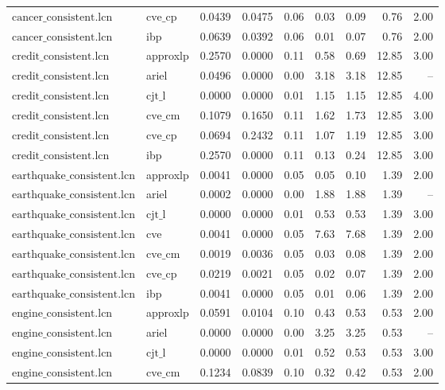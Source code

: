\begin{table}[ht]
\begin{tabular}{llrrrrrrr}
$\text{cancer\_consistent.lcn}$ & $\text{cve\_cp}$ & 0.0439 & 0.0475 & 0.06 & 0.03 & 0.09 & 0.76 & 2.00 \\
$\text{cancer\_consistent.lcn}$ & ibp & 0.0639 & 0.0392 & 0.06 & 0.01 & 0.07 & 0.76 & 2.00 \\
$\text{credit\_consistent.lcn}$ & approxlp & 0.2570 & 0.0000 & 0.11 & 0.58 & 0.69 & 12.85 & 3.00 \\
$\text{credit\_consistent.lcn}$ & ariel & 0.0496 & 0.0000 & 0.00 & 3.18 & 3.18 & 12.85 & -- \\
$\text{credit\_consistent.lcn}$ & $\text{cjt\_l}$ & 0.0000 & 0.0000 & 0.01 & 1.15 & 1.15 & 12.85 & 4.00 \\
$\text{credit\_consistent.lcn}$ & $\text{cve\_cm}$ & 0.1079 & 0.1650 & 0.11 & 1.62 & 1.73 & 12.85 & 3.00 \\
$\text{credit\_consistent.lcn}$ & $\text{cve\_cp}$ & 0.0694 & 0.2432 & 0.11 & 1.07 & 1.19 & 12.85 & 3.00 \\
$\text{credit\_consistent.lcn}$ & ibp & 0.2570 & 0.0000 & 0.11 & 0.13 & 0.24 & 12.85 & 3.00 \\
$\text{earthquake\_consistent.lcn}$ & approxlp & 0.0041 & 0.0000 & 0.05 & 0.05 & 0.10 & 1.39 & 2.00 \\
$\text{earthquake\_consistent.lcn}$ & ariel & 0.0002 & 0.0000 & 0.00 & 1.88 & 1.88 & 1.39 & -- \\
$\text{earthquake\_consistent.lcn}$ & $\text{cjt\_l}$ & 0.0000 & 0.0000 & 0.01 & 0.53 & 0.53 & 1.39 & 3.00 \\
$\text{earthquake\_consistent.lcn}$ & cve & 0.0041 & 0.0000 & 0.05 & 7.63 & 7.68 & 1.39 & 2.00 \\
$\text{earthquake\_consistent.lcn}$ & $\text{cve\_cm}$ & 0.0019 & 0.0036 & 0.05 & 0.03 & 0.08 & 1.39 & 2.00 \\
$\text{earthquake\_consistent.lcn}$ & $\text{cve\_cp}$ & 0.0219 & 0.0021 & 0.05 & 0.02 & 0.07 & 1.39 & 2.00 \\
$\text{earthquake\_consistent.lcn}$ & ibp & 0.0041 & 0.0000 & 0.05 & 0.01 & 0.06 & 1.39 & 2.00 \\
$\text{engine\_consistent.lcn}$ & approxlp & 0.0591 & 0.0104 & 0.10 & 0.43 & 0.53 & 0.53 & 2.00 \\
$\text{engine\_consistent.lcn}$ & ariel & 0.0000 & 0.0000 & 0.00 & 3.25 & 3.25 & 0.53 & -- \\
$\text{engine\_consistent.lcn}$ & $\text{cjt\_l}$ & 0.0000 & 0.0000 & 0.01 & 0.52 & 0.53 & 0.53 & 3.00 \\
$\text{engine\_consistent.lcn}$ & $\text{cve\_cm}$ & 0.1234 & 0.0839 & 0.10 & 0.32 & 0.42 & 0.53 & 2.00 \\

\end{tabular}
\end{table}
